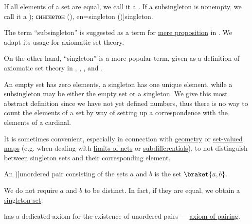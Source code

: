 \begin{definition}\label{def:subsingleton_set}
  If all elements of a set are equal, we call it a . If a subsingleton is nonempty, we call it a \term[ru=синглет (\cite[131]{КановейЛюбецкий2010СовременнаяТеорияМножеств}); синглетон (\cite[129]{КолмогоровДрагалин2006Логика}), en=singleton (\cite[10]{Halmos1960NaiveSetTheory})]{singleton}.
\end{definition}
\begin{comments}
  \item The term \enquote{subsingleton} is suggested as a term for \hyperref[def:mere_proposition]{mere proposition} in \cite[112]{UnivalentFoundationsProgram2013HoTT}. We adapt its usage for axiomatic set theory.

  On the other hand, \enquote{singleton} is a more popular term, given as a definition of axiomatic set theory in
  \cite[10]{Halmos1960NaiveSetTheory},
  \cite[7]{Jech2006SetTheory},
  \cite[235]{Mendelson2015Logic}
  \cite[3]{Kelley1975GeneralTopology},
  \cite[131]{КановейЛюбецкий2010СовременнаяТеорияМножеств} and
  \cite[129]{КолмогоровДрагалин2006Логика}.

  \item An empty set has zero elements, a singleton has one unique element, while a subsingleton may be either the empty set or a singleton. We give this most abstract definition since we have not yet defined numbers, thus there is no way to count the elements of a set by way of setting up a correspondence with the elements of a cardinal.

  \item It is sometimes convenient, especially in connection with \hyperref[ch:geometry]{geometry} or \hyperref[def:function]{set-valued maps} (e.g. when dealing with \hyperref[def:net_limit_point]{limits of nets} or \hyperref[def:subdifferentials]{subdifferentials}), to not distinguish between singleton sets and their corresponding element.
\end{comments}

\begin{definition}\label{def:unordered_pair}
  An \term[ru=неупорядоченная пара (\cite[127]{Герасимов2011Вычислимость})]{unordered pair} consisting of the sets \( a \) and \( b \) is the set \( \braket{ a, b } \).

  We do not require \( a \) and \( b \) to be distinct. In fact, if they are equal, we obtain a \hyperref[def:subsingleton_set]{singleton set}.
\end{definition}
\begin{comments}
  \item \hyperref[def:zfc]{} has a dedicated axiom for the existence of unordered pairs --- \hyperref[def:zfc/pairing]{axiom of pairing}.
\end{comments}

